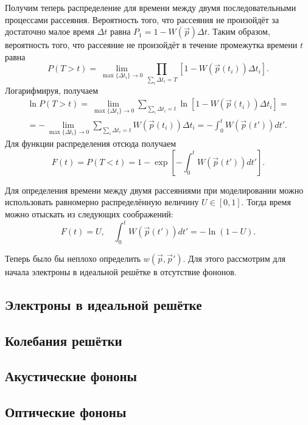\documentclass{article}
\begin{document}
Получим теперь распределение для времени между двумя последовательными процессами рассеяния. Вероятность того, что рассеяния не произойдёт за достаточно малое время \( \Delta t \) равна \( P_1 = 1 - W(\vec{p})\Delta t \). Таким образом, вероятность того, что рассеяние не произойдёт в течение промежутка времени \( t \) равна
\begin{equation}
    P(T > t) = \lim_{\max\{\Delta t_i\} \to 0} \prod_{\sum_i \Delta t_i = T} \left[1 - W(\vec{p}(t_i))\Delta t_i\right].
\end{equation}
Логарифмируя, получаем
\begin{gather}
    \ln P(T > t) = \lim_{\max\{\Delta t_i\} \to 0} \sum_{\sum_i \Delta t_i = t} \ln\left[1 - W(\vec{p}(t_i))\Delta t_i\right] = \\ = -\lim_{\max\{\Delta t_i\} \to 0} \sum_{\sum_i \Delta t_i = t} W(\vec{p}(t_i))\Delta t_i = -\int_0^t W(\vec{p}(t')) dt'.
\end{gather}
Для функции распределения отсюда получаем
\begin{equation}
    F(t) = P(T < t) = 1 - \exp\left[-\int_0^t W(\vec{p}(t')) dt'\right].
\end{equation}

Для определения времени между двумя рассеяниями при моделировании можно использовать равномерно распределённую величину \(U \in [0, 1]\). Тогда время можно отыскать из следующих соображений:
\begin{equation}
    F(t) = U,\quad \int_0^t W(\vec{p}(t')) dt' = -\ln (1 - U).
\end{equation}

Теперь было бы неплохо определить \( w(\vec{p}, \vec{p}') \). Для этого рассмотрим для начала электроны в идеальной решётке в отсутствие фононов.

\subsection{Электроны в идеальной решётке}
\subsection{Колебания решётки}
\subsection{Акустические фононы}
\subsection{Оптические фононы}
\end{document}
